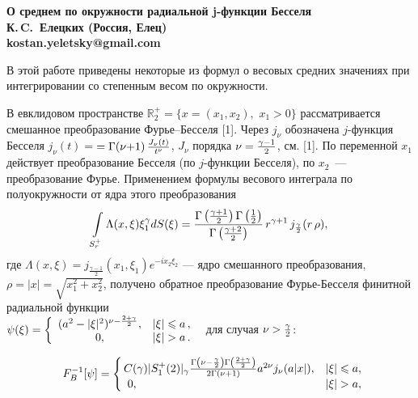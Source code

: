 
\begin{center}
	\bf О среднем по окружности радиальной j-функции Бесселя \\
	К.\,C.~Елецких (Россия, Елец)\\
	kostan.yeletsky@gmail.com\\
\end{center}


В этой работе приведены некоторые из формул о весовых средних значениях при интегрировании со степенным весом по окружности.

В евклидовом пространстве $\mathbb{R}_2^+=\{x=(x_1,x_2),\,\,x_1>0\}$
рассматривается смешанное преобразование Фу\-рье--Бес\-се\-ля [1].
Через $j_\nu$ обозначена $j$-функция Бесселя
$j_\nu(t)=
$\linebreak$
=
\Gamma(\nu{+}1)\,{J_\nu(t)\over t^\nu}$, $J_\nu$ порядка
$\nu={\gamma-1\over2}$, см. [1].
По  переменной $x_1$ действует преобразование Бесселя (по $j$-функции Бесселя), по $x_2$~--- преобразование Фурье.
Применением  формулы  весового интеграла по полуокружности от ядра этого преобразования
$$\int\limits_{S_r^+}{\Lambda(x,\xi)\xi_1^\gamma}dS(\xi)
=\frac{\Gamma\left(\gamma+1\over2\right)\Gamma\left(1\over2\right)}{\Gamma\left(\gamma+2\over2\right)}\,r^{\gamma+1}\,j_{\frac{\gamma}{2}}(r\,\rho),$$
где $\Lambda(x,\xi)=j_\frac{\gamma-1}{2}(x_1,\xi_1)e^{-ix_2\xi_2}$ --- ядро смешанного преобразования, $\rho=|x|=\sqrt{x_1^2+x_2^2}$,
получено обратное преобразование Фурье-Бесселя финитной радиальной функции\\ $\psi(\xi)=\left\{ \begin{array}{cc}
          (a^2-|\xi|^2)^{{\nu-{2+\gamma\over2}}} , & |\xi|\leqslant a\,, \\
					   0  ,& |\xi|>a\,.
\end{array}\right.\,\,$ для случая $\nu>{\gamma\over2}$:

\begin{multline*}
	F^{-1}_B[\psi]=
	\left\{\begin{array}{lc}
		\!\!C(\gamma)|S^+_1(2)|_\gamma\frac{\Gamma\left(\nu-\frac{\gamma}{2}\right)\Gamma\left(\frac{2+\gamma}{2}\right)}
		{2\Gamma\left(\nu+1\right)}a^{2\nu}
		j_{\nu}(a|x|), & |\xi|\leqslant a,\\
		0  ,& |\xi|>a,
	\end{array}\hspace{-1em}\right.
\end{multline*}


